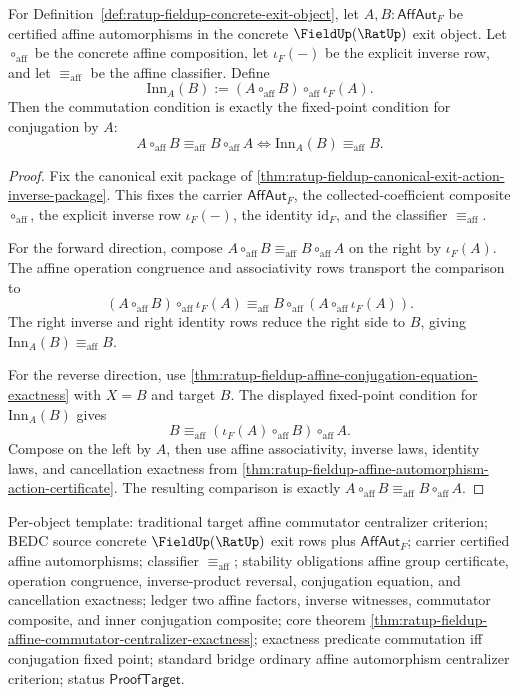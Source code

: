 \begin{theorem}
\label{thm:ratup-fieldup-affine-commutator-centralizer-exactness}
For Definition~\ref{def:ratup-fieldup-concrete-exit-object}, let
$A,B:\mathsf{AffAut}_F$ be certified affine automorphisms in the concrete
$\FieldUp(\RatUp)$ exit object. Let $\circ_{\mathrm{aff}}$ be the concrete
affine composition, let $\iota_F(-)$ be the explicit inverse row, and let
$\equiv_{\mathrm{aff}}$ be the affine classifier. Define
$$
\mathrm{Inn}_A(B):=(A\circ_{\mathrm{aff}}B)\circ_{\mathrm{aff}}\iota_F(A).
$$
Then the commutation condition is exactly the fixed-point condition for
conjugation by $A$:
$$
A\circ_{\mathrm{aff}}B\equiv_{\mathrm{aff}}B\circ_{\mathrm{aff}}A
\Longleftrightarrow
\mathrm{Inn}_A(B)\equiv_{\mathrm{aff}}B.
$$
\end{theorem}
\begin{proof}
Fix the canonical exit package of
\autoref{thm:ratup-fieldup-canonical-exit-action-inverse-package}. This fixes
the carrier $\mathsf{AffAut}_F$, the collected-coefficient composite
$\circ_{\mathrm{aff}}$, the explicit inverse row $\iota_F(-)$, the identity
$\mathrm{id}_F$, and the classifier $\equiv_{\mathrm{aff}}$.

For the forward direction, compose
$A\circ_{\mathrm{aff}}B\equiv_{\mathrm{aff}}B\circ_{\mathrm{aff}}A$ on the
right by $\iota_F(A)$. The affine operation congruence and associativity rows
transport the comparison to
$$
(A\circ_{\mathrm{aff}}B)\circ_{\mathrm{aff}}\iota_F(A)
\equiv_{\mathrm{aff}}
B\circ_{\mathrm{aff}}(A\circ_{\mathrm{aff}}\iota_F(A)).
$$
The right inverse and right identity rows reduce the right side to $B$, giving
$\mathrm{Inn}_A(B)\equiv_{\mathrm{aff}}B$.

For the reverse direction, use
\autoref{thm:ratup-fieldup-affine-conjugation-equation-exactness} with
$X=B$ and target $B$. The displayed fixed-point condition for
$\mathrm{Inn}_A(B)$ gives
$$
B\equiv_{\mathrm{aff}}(\iota_F(A)\circ_{\mathrm{aff}}B)\circ_{\mathrm{aff}}A.
$$
Compose on the left by $A$, then use affine associativity, inverse laws,
identity laws, and cancellation exactness from
\autoref{thm:ratup-fieldup-affine-automorphism-action-certificate}. The
resulting comparison is exactly
$A\circ_{\mathrm{aff}}B\equiv_{\mathrm{aff}}B\circ_{\mathrm{aff}}A$.
\end{proof}

Per-object template: traditional target affine commutator centralizer
criterion; BEDC source concrete $\FieldUp(\RatUp)$ exit rows plus
$\mathsf{AffAut}_F$; carrier certified affine automorphisms; classifier
$\equiv_{\mathrm{aff}}$; stability obligations affine group certificate,
operation congruence, inverse-product reversal, conjugation equation, and
cancellation exactness; ledger two affine factors, inverse witnesses,
commutator composite, and inner conjugation composite; core theorem
\autoref{thm:ratup-fieldup-affine-commutator-centralizer-exactness}; exactness
predicate commutation iff conjugation fixed point;
standard bridge ordinary affine automorphism centralizer criterion; status
$\mathsf{ProofTarget}$.

